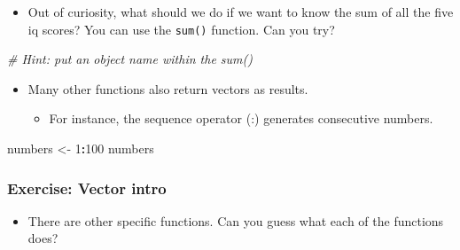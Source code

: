 \documentclass[
]{book}
\newenvironment{Shaded}{\begin{snugshade}}{\end{snugshade}}
\newcommand{\CommentTok}[1]{\textcolor[rgb]{0.56,0.35,0.01}{\textit{#1}}}
\newcommand{\DecValTok}[1]{\textcolor[rgb]{0.00,0.00,0.81}{#1}}
\newcommand{\NormalTok}[1]{#1}
\newcommand{\OtherTok}[1]{\textcolor[rgb]{0.56,0.35,0.01}{#1}}
\newcommand{\SpecialCharTok}[1]{\textcolor[rgb]{0.81,0.36,0.00}{\textbf{#1}}}
\providecommand{\tightlist}{%
  \setlength{\itemsep}{0pt}\setlength{\parskip}{0pt}}
\begin{document}
\begin{itemize}
\tightlist
\item
  Out of curiosity, what should we do if we want to know the sum of all the five iq scores? You can use the \texttt{sum()} function. Can you try?
\end{itemize}

\begin{Shaded}
\begin{Highlighting}[]
\CommentTok{\# Hint: put an object name within the sum()}
\end{Highlighting}
\end{Shaded}

\begin{itemize}
\tightlist
\item
  Many other functions also return vectors as results.

  \begin{itemize}
  \tightlist
  \item
    For instance, the sequence operator (:) generates consecutive numbers.
  \end{itemize}
\end{itemize}

\begin{Shaded}
\begin{Highlighting}[]
\NormalTok{numbers }\OtherTok{\textless{}{-}} \DecValTok{1}\SpecialCharTok{:}\DecValTok{100}
\NormalTok{numbers}
\end{Highlighting}
\end{Shaded}

\subsubsection{Exercise: Vector intro}\label{exercise-vector-intro}

\begin{itemize}
\tightlist
\item
  There are other specific functions. Can you guess what each of the functions does?
\end{itemize}
\end{document}
